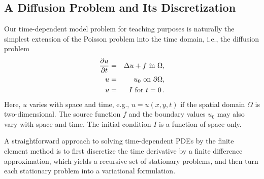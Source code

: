 \subsection{A Diffusion Problem and Its Discretization}
\label{langtangen:timedep:diffusion1}

Our time-dependent
model problem for teaching purposes is naturally the simplest
extension of the Poisson problem into the time domain, i.e.,
the diffusion problem
\begin{eqnarray}
{\partial u\over\partial t} &=& \Delta u + f \mbox{ in } \Omega,
\label{langtangen:diffusion:pde1}\\
    u &=& u_0 \mbox{ on } \partial \Omega,
\label{langtangen:diffusion:pde1:bc}\\
    u &=& I   \mbox{ for } t=0\thinspace .
\label{langtangen:diffusion:pde1:ic}
\end{eqnarray}
Here, $u$ varies with space and time, e.g., $u=u(x,y,t)$ if the spatial
domain $\Omega$ is two-dimensional. The source function $f$ and the
boundary values $u_0$ may also vary with space and time.
The initial condition $I$ is a function of space only.

A straightforward approach to solving time-dependent
PDEs by the finite element method is to first discretize the
time derivative by a finite difference approximation, which yields
a recursive set of stationary problems, and then turn each stationary
problem into a variational formulation.

